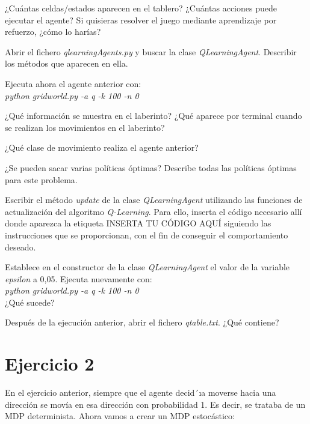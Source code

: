 \documentclass[11pt]{exam}
\begin{document}
\begin{questions}
	
{ \question ¿Cuántas celdas/estados aparecen en el tablero? ¿Cuántas acciones puede ejecutar el agente? Si quisieras resolver el juego mediante aprendizaje por refuerzo, ¿cómo lo harías? 
}

{ \question Abrir el fichero \textit{qlearningAgents.py} y buscar la clase \textit{QLearningAgent}. Describir los métodos que aparecen en ella.
}

{ \question Ejecuta ahora el agente anterior con: \\ \textit{python gridworld.py -a q -k 100 -n 0}}

{ \question ¿Qué información se muestra en el laberinto? ¿Qué aparece por terminal cuando se realizan los movimientos en el laberinto? 
}

{ \question ¿Qué clase de movimiento realiza el agente anterior?}

{ \question ¿Se pueden sacar varias políticas óptimas? Describe todas las políticas óptimas para este problema.}

{ \question Escribir el método \textit{update} de la clase \textit{QLearningAgent} utilizando las funciones de actualización del algoritmo \textit{Q-Learning}. Para ello, inserta el código necesario allí donde aparezca la etiqueta INSERTA TU CÓDIGO AQUÍ siguiendo las instrucciones que se proporcionan, con el fin de conseguir el comportamiento deseado. }

{ \question Establece en el constructor de la clase \textit{QLearningAgent} el valor de la variable \textit{epsilon} a 0,05. Ejecuta nuevamente con: \\ \textit{python gridworld.py -a q -k 100 -n 0} \\ ¿Qué sucede?
}

{ \question Después de la ejecución anterior, abrir el fichero \textit{qtable.txt}. ¿Qué contiene?}

\end{questions}

\section*{Ejercicio 2}

En el ejercicio anterior, siempre que el agente decid´ıa moverse hacia una dirección se movía en esa dirección con probabilidad 1. Es decir, se trataba de un MDP determinista. Ahora vamos a crear un MDP estocástico:
\end{document}
